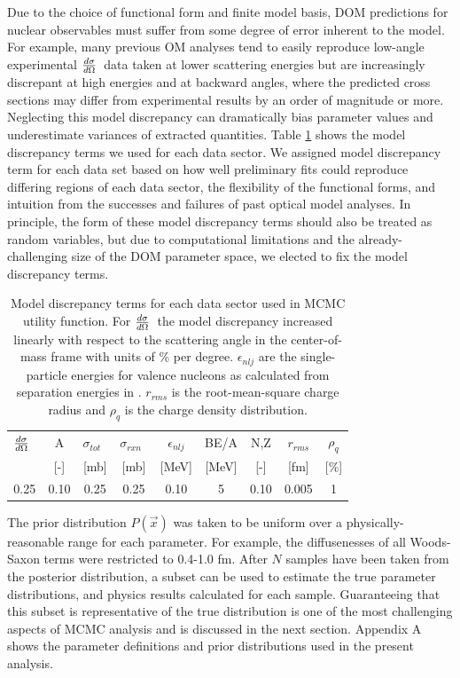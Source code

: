 \documentclass[twocolumn,secnumarabic,amssymb, nobibnotes, aps, prl,
superscriptaddress, nobalancelastpage, draft]{revtex4}
\newcommand{\tot}{\ensuremath{\sigma_{tot}}}
\newcommand{\rxn}{\ensuremath{\sigma_{rxn}}}
\newcommand{\el}{\ensuremath{\frac{\lowercase{d}\sigma}{\lowercase{d}\Omega}}}
\begin{document}
Due to the choice of functional form and finite model basis,
DOM predictions for nuclear observables must suffer from some degree of error
inherent to the model. For example, many previous
OM analyses tend to easily reproduce low-angle experimental \el\ data taken at
lower scattering energies but are increasingly discrepant at high energies
and at backward angles, where the predicted cross sections may
differ from experimental results by an order of magnitude or more. 
Neglecting this model discrepancy can
dramatically bias parameter values and underestimate variances of extracted
quantities. Table \ref{ModelDiscrepancyTable} shows the model discrepancy terms we used 
for each data sector. We assigned model discrepancy term for each data set
based on how well preliminary fits could reproduce differing regions of each
data sector, the flexibility of the functional forms, and intuition
from the successes and failures of past optical model analyses.
In principle, the form of these model discrepancy terms should also be treated as random
variables, but due to computational limitations and the already-challenging size
of the DOM parameter space, we elected to fix the model discrepancy terms.

\begin{table}[tb]
    \centering
    \begin{tabular}{ c c c c c c c c c}
        \el\ & A & \tot\ & \rxn\ & $\epsilon_{nlj}$ & BE/A & N,Z & $r_{rms}$ & $\rho_{q}$ \\ \relax
        [\%/$\degree$] & [-] & [mb] & [mb] & [MeV] & [MeV] & [-] & [fm] & [\%] \\
        \hline
        0.25 & 0.10 & 0.25 & 0.25 & 0.10 & 5 & 0.10 & 0.005 & 1 \\
    \end{tabular}
    \caption{Model discrepancy terms for each data sector used in
        MCMC utility function. For \el\, the model discrepancy increased
        linearly with respect to the scattering angle in the
        center-of-mass frame with units of \% per degree. $\epsilon_{nlj}$
        are the single-particle energies for valence nucleons as calculated
        from separation energies in \cite{AME2016}.
        $r_{rms}$ is the root-mean-square charge radius and
        $\rho_{q}$ is the charge density distribution.}
    \label{ModelDiscrepancyTable}
\end{table}

    The prior distribution $P(\vec{x})$ was taken to be uniform over a
physically-reasonable range for each parameter. For example, the
diffusenesses of all Woods-Saxon terms were restricted to 0.4-1.0 fm.
After $N$ samples have been taken from the posterior distribution,
a subset can be used to estimate the true parameter distributions,
and physics results calculated for each sample. Guaranteeing that this subset is
representative of the true distribution is one of the most challenging aspects
of MCMC analysis and is discussed in the next section. Appendix A
shows the parameter definitions and prior distributions used in the present
analysis.
\end{document}
